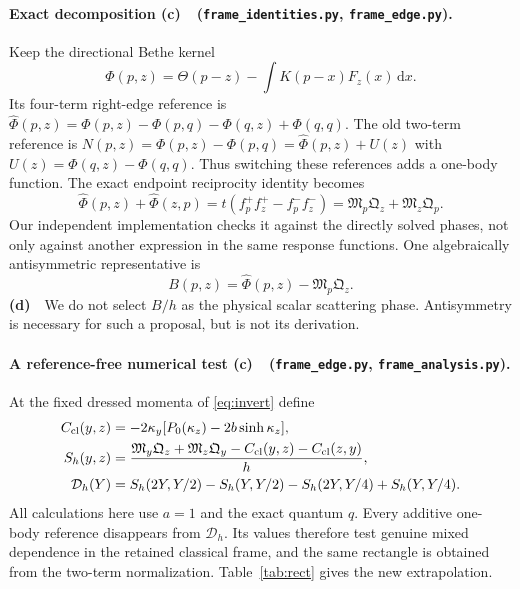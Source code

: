 \documentclass[11pt,a4paper]{article}
\newcommand{\Lc}{\textbf{(c)}\ }
\newcommand{\Ld}{\textbf{(d)}\ }
\newcommand{\dd}{\mathrm d}
\newcommand{\id}{\texttt{frame\_\allowbreak identities.py}}
\newcommand{\ed}{\texttt{frame\_\allowbreak edge.py}}
\newcommand{\an}{\texttt{frame\_\allowbreak analysis.py}}
\begin{document}
\paragraph{Exact decomposition \Lc\ (\id, \ed).}
Keep the directional Bethe kernel
\begin{equation}
 \Phi(p,z)=\Theta(p-z)-\int K(p-x)F_z(x)\,\dd x .
\end{equation}
Its four-term right-edge reference is
$\widehat\Phi(p,z)=\Phi(p,z)-\Phi(p,q)-\Phi(q,z)+\Phi(q,q)$.
The old two-term reference is
$N(p,z)=\Phi(p,z)-\Phi(p,q)=\widehat\Phi(p,z)+U(z)$ with
$U(z)=\Phi(q,z)-\Phi(q,q)$. Thus switching these references adds a one-body
function. The exact endpoint reciprocity identity becomes
\begin{equation}
 \widehat\Phi(p,z)+\widehat\Phi(z,p)
 =t(f_p^+f_z^+-f_p^-f_z^-)
 =\mathfrak M_p\mathfrak Q_z+\mathfrak M_z\mathfrak Q_p.
 \label{eq:recip}
\end{equation}
Our independent implementation checks it against the directly solved phases,
not only against another expression in the same response functions.
One algebraically antisymmetric representative is
\begin{equation}
 B(p,z)=\widehat\Phi(p,z)-\mathfrak M_p\mathfrak Q_z.
 \label{eq:B}
\end{equation}
\Ld\ We do not select $B/h$ as the physical scalar scattering phase.
Antisymmetry is necessary for such a proposal, but is not its derivation.

\paragraph{A reference-free numerical test \Lc\ (\ed, \an).}
At the fixed dressed momenta of \eqref{eq:invert} define
\begin{align}
 C_{\rm cl}(y,z)&=-2\kappa_y[P_0(\kappa_z)-2b\sinh\kappa_z],\\
 S_h(y,z)&=\frac{\mathfrak M_y\mathfrak Q_z+
 \mathfrak M_z\mathfrak Q_y-C_{\rm cl}(y,z)-C_{\rm cl}(z,y)}h,\\
 \mathcal D_h(Y)&=S_h(2Y,Y/2)-S_h(Y,Y/2)
                    -S_h(2Y,Y/4)+S_h(Y,Y/4).
 \label{eq:rectangle}
\end{align}
All calculations here use $a=1$ and the exact quantum $q$.
Every additive one-body reference disappears from $\mathcal D_h$.
Its values therefore test genuine mixed dependence in the retained
classical frame, and the same rectangle is obtained from the two-term
normalization. Table~\ref{tab:rect} gives the new extrapolation.
\end{document}
